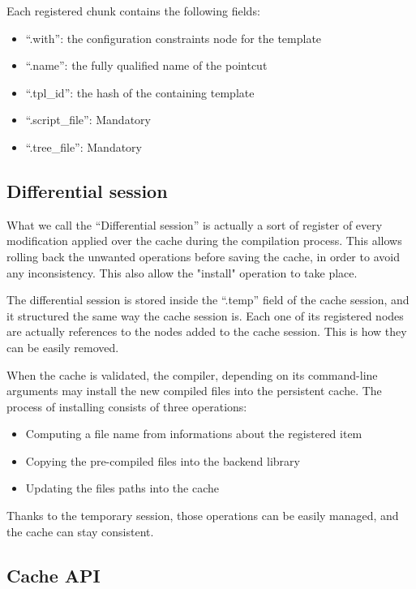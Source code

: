 \documentclass[american]{rtxreport}
\begin{document}
Each registered chunk contains the following fields:
\begin{itemize}
    \item ``.with'': the configuration constraints node for the template
    \item ``.name'': the fully qualified name of the pointcut
    \item ``.tpl\_id'': the hash of the containing template
    \item ``.script\_file'': Mandatory
    \item ``.tree\_file'': Mandatory
\end{itemize}


\subsection{Differential session}

What we call the ``Differential session'' is actually a sort of register of
every modification applied over the cache during the compilation process. This
allows rolling back the unwanted operations before saving the cache, in order
to avoid any inconsistency. This also allow the "install" operation to take
place.

The differential session is stored inside the ``.temp'' field of the cache
session, and it structured the same way the cache session is. Each one of its
registered nodes are actually references to the nodes added to the cache
session. This is how they can be easily removed.

When the cache is validated, the compiler, depending on its command-line
arguments may install the new compiled files into the persistent cache. The
process of installing consists of three operations:
\begin{itemize}
    \item Computing a file name from informations about the registered item
    \item Copying the pre-compiled files into the backend library
    \item Updating the files paths into the cache
\end{itemize}

Thanks to the temporary session, those operations can be easily managed, and
the cache can stay consistent.


\subsection{Cache API}
\end{document}
